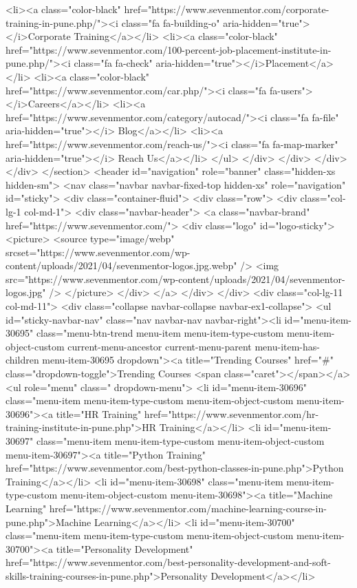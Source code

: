 {<li><a class="color-black" href="https://www.sevenmentor.com/corporate-training-in-pune.php/"><i class="fa fa-building-o" aria-hidden="true"></i>Corporate Training</a></li>
<li><a class="color-black" href="https://www.sevenmentor.com/100-percent-job-placement-institute-in-pune.php/"><i class="fa fa-check" aria-hidden="true"></i>Placement</a></li>
<li><a class="color-black" href="https://www.sevenmentor.com/car.php/"><i class="fa fa-users"></i>Careers</a></li>
<li><a href="https://www.sevenmentor.com/category/autocad/"><i class="fa fa-file" aria-hidden="true"></i> Blog</a></li>
<li><a href="https://www.sevenmentor.com/reach-us/"><i class="fa fa-map-marker" aria-hidden="true"></i> Reach Us</a></li>
</ul>
</div>
</div>
</div>
</div>
</section>
<header id="navigation" role="banner" class="hidden-xs hidden-sm">
<nav class="navbar navbar-fixed-top hidden-xs" role="navigation" id="sticky">
<div class="container-fluid">
<div class="row">
<div class="col-lg-1 col-md-1">
 <div class="navbar-header">
<a class="navbar-brand" href="https://www.sevenmentor.com/">
<div class="logo" id="logo-sticky">
<picture>
<source type="image/webp" srcset="https://www.sevenmentor.com/wp-content/uploads/2021/04/sevenmentor-logos.jpg.webp" />
<img src="https://www.sevenmentor.com/wp-content/uploads/2021/04/sevenmentor-logos.jpg" />
</picture>
</div>
</a>
</div>
</div>
<div class="col-lg-11 col-md-11">
<div class="collapse navbar-collapse navbar-ex1-collapse">
<ul id="sticky-navbar-nav" class="nav navbar-nav navbar-right"><li id="menu-item-30695" class="menu-btn-trend menu-item menu-item-type-custom menu-item-object-custom current-menu-ancestor current-menu-parent menu-item-has-children menu-item-30695 dropdown"><a title="Trending Courses" href="#" class="dropdown-toggle">Trending Courses <span class="caret"></span></a>
<ul role="menu" class=" dropdown-menu">
<li id="menu-item-30696" class="menu-item menu-item-type-custom menu-item-object-custom menu-item-30696"><a title="HR Training" href="https://www.sevenmentor.com/hr-training-institute-in-pune.php">HR Training</a></li>
<li id="menu-item-30697" class="menu-item menu-item-type-custom menu-item-object-custom menu-item-30697"><a title="Python Training" href="https://www.sevenmentor.com/best-python-classes-in-pune.php">Python Training</a></li>
<li id="menu-item-30698" class="menu-item menu-item-type-custom menu-item-object-custom menu-item-30698"><a title="Machine Learning" href="https://www.sevenmentor.com/machine-learning-course-in-pune.php">Machine Learning</a></li>
<li id="menu-item-30700" class="menu-item menu-item-type-custom menu-item-object-custom menu-item-30700"><a title="Personality Development" href="https://www.sevenmentor.com/best-personality-development-and-soft-skills-training-courses-in-pune.php">Personality Development</a></li>
}
